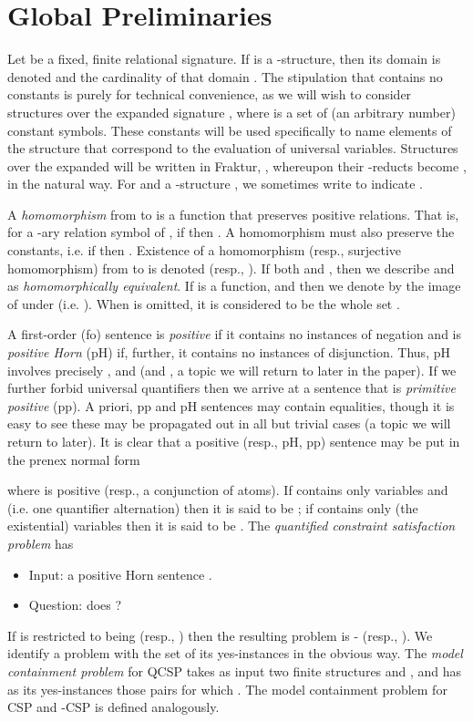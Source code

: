 \documentclass{LMCS}
\begin{document}
\section{Global Preliminaries}

Let  be a fixed, finite relational signature. If  is a -structure, then its domain is denoted  and the cardinality of that domain . The stipulation that  contains no constants is purely for technical convenience, as we will wish to consider structures over the expanded signature , where  is a set of (an arbitrary number)  constant symbols. These constants will be used specifically to name elements of the structure that correspond to the evaluation of universal variables. Structures over the expanded  will be written in Fraktur, , whereupon their -reducts become , in the natural way. For  and a -structure , we sometimes write  to indicate .

A \emph{homomorphism} from  to  is a function  that preserves positive relations. That is, for  a -ary relation symbol of , if  then . A homomorphism  must also preserve the constants, i.e. if  then .
Existence of a homomorphism (resp., surjective homomorphism) from  to  is denoted  (resp., ). If both  and , then we describe  and  as \emph{homomorphically equivalent}. If  is a function, and  then we denote by  the image of  under  (i.e. ). When  is omitted, it is considered to be the whole set .

A first-order (fo) sentence  is \emph{positive} if it contains no instances of negation and is \emph{positive Horn} (pH) if, further, it contains no instances of disjunction. Thus, pH involves precisely ,  and  (and , a topic we will return to later in the paper). If we further forbid universal quantifiers then we arrive at a sentence that is \emph{primitive positive} (pp). A priori, pp and pH sentences may contain equalities, though it is easy to see these may be propagated out in all but trivial cases (a topic we will return to later). It is clear that a positive (resp., pH, pp) sentence may be put in the prenex normal form

where  is positive (resp., a conjunction of atoms). If  contains only variables  and  (i.e. one quantifier alternation) then it is said to be ; if  contains only (the existential) variables  then it is said to be .
The \emph{quantified constraint satisfaction problem}  has
\begin{itemize}
\item Input: a positive Horn sentence .
\item Question: does ?
\end{itemize}
If  is restricted to being  (resp., ) then the resulting problem is - (resp., ). We identify a problem with the set of its yes-instances in the obvious way. The \emph{model containment problem} for QCSP takes as input two finite structures  and , and has as its yes-instances those pairs for which  . The model containment problem for CSP and -CSP is defined analogously.
\end{document}
